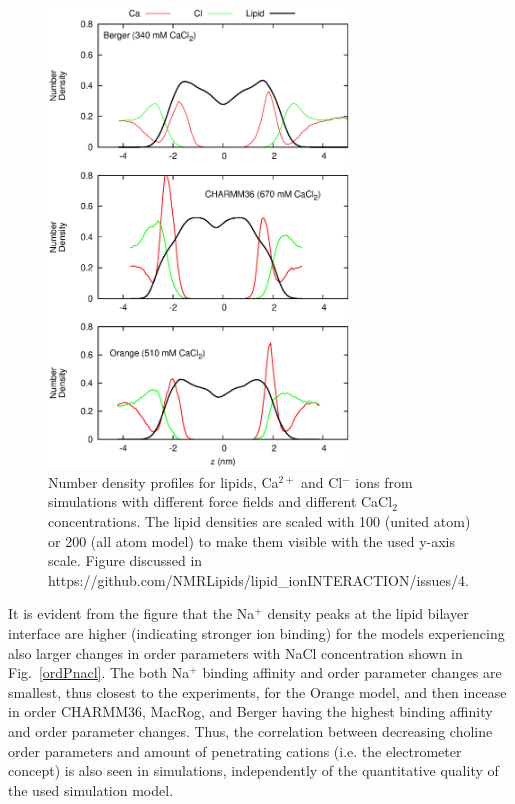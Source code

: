 \documentclass[pre,aps,floatfix,authordate1-4,twocolumn]{revtex4-1}
\begin{document}
\begin{figure}[]
  \centering
  \includegraphics[width=8cm]{../Fig/CAdensities.eps}
  \caption{\label{IONdensCOMP}
    Number density profiles for lipids, Ca$^{2+}$ and Cl$^-$ ions from simulations with different force fields and different CaCl$_2$ concentrations. 
    The lipid densities are scaled with 100 (united atom) or 200 (all atom model) to make them visible with the used y-axis scale.
    Figure discussed in https://github.com/NMRLipids/lipid\_ionINTERACTION/issues/4.
  }
\end{figure}
It is evident from the figure that the Na$^+$ density peaks at the lipid bilayer interface are higher (indicating stronger ion binding) for the models
experiencing also larger changes in order parameters with NaCl concentration shown in Fig.~\ref{ordPnacl}. 
The both Na$^+$ binding affinity and order parameter changes are smallest, thus closest to the experiments, for the Orange model, and then incease 
in order CHARMM36, MacRog, and Berger having the highest binding affinity and order parameter changes.
Thus, the correlation between decreasing choline order parameters
and amount of penetrating cations (i.e. the electrometer concept) is also seen in simulations, independently of the quantitative quality of the used simulation model.
\end{document}
